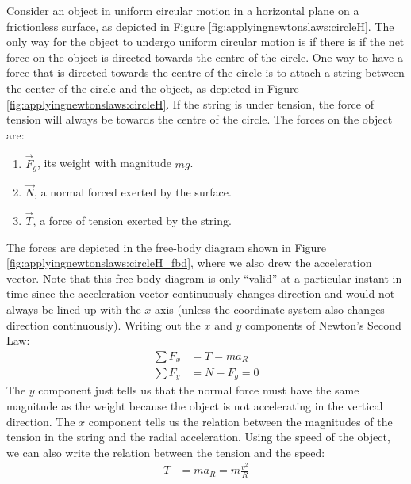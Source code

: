 Consider an object in uniform circular motion in a horizontal plane on a frictionless surface, as depicted in Figure \ref{fig:applyingnewtonslaws:circleH}.
The only way for the object to undergo uniform circular motion is if there is if the net force on the object is directed towards the centre of the circle. One way to have a force that is directed towards the centre of the circle is to attach a string between the center of the circle and the object, as depicted in Figure \ref{fig:applyingnewtonslaws:circleH}. If the string is under tension, the force of tension will always be towards the centre of the circle. The forces on the object are:
\begin{enumerate}
\item $\vec F_g$, its weight with magnitude $mg$.
\item $\vec N$, a normal forced exerted by the surface.
\item $\vec T$, a force of tension exerted by the string.
\end{enumerate}
The forces are depicted in the free-body diagram shown in Figure \ref{fig:applyingnewtonslaws:circleH_fbd}, where we also drew the acceleration vector. Note that this free-body diagram is only ``valid'' at a particular instant in time since the acceleration vector continuously changes direction and would not always be lined up with the $x$ axis (unless the coordinate system also changes direction continuously). 
Writing out the $x$ and $y$ components of Newton's Second Law:
\begin{align*}
\sum F_x &= T = ma_R\\
\sum F_y &= N - F_g =0
\end{align*}
The $y$ component just tells us that the normal force must have the same magnitude as the weight because the object is not accelerating in the vertical direction. The $x$ component tells us the relation between the magnitudes of the tension in the string and the radial acceleration. Using the speed of the object, we can also write the relation between the tension and the speed:
\begin{align*}
T &= ma_R=m\frac{v^2}{R}\\
\end{align*}


